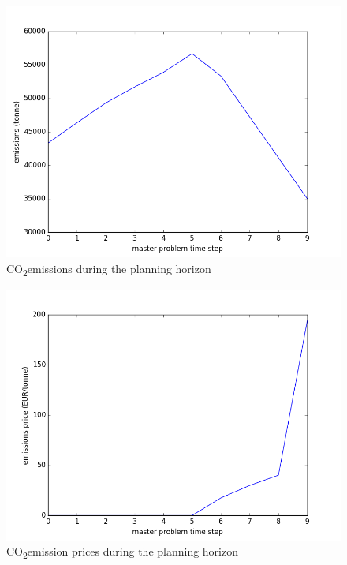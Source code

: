\documentclass[final]{IEEEtran}
\newcommand{\COtwo}{CO\textsubscript{2}\;}
\begin{document}
\begin{figure}[htpb]
  \centering
  \includegraphics[width=\linewidth]{emissions_trajectory_milp_dc_miqp_dc.png}
  \caption{\COtwo emissions during the planning horizon}
  \label{fig_emissions_trajectory}
\end{figure}

\begin{figure}[htpb]
  \centering
  \includegraphics[width=\linewidth]{emissions_prices_trajectory_milp_dc_miqp_dc.png}
  \caption{\COtwo emission prices during the planning horizon}
  \label{fig_emissions_prices_trajectory}
\end{figure}
\end{document}
